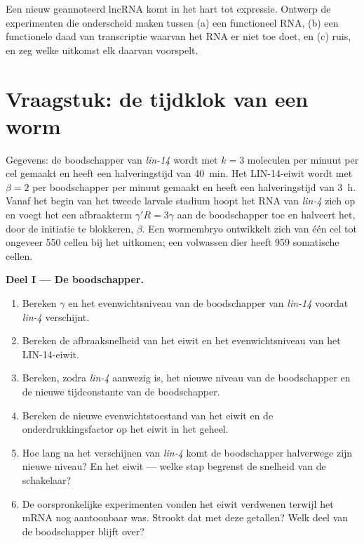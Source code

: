 \begin{exercise}[$\star\star\star$]\label{exo:b3:rna-regulation:12}
Een nieuw geannoteerd lncRNA komt in het hart tot expressie. Ontwerp de
experimenten die onderscheid maken tussen (a) een functioneel RNA, (b)
een functionele daad van transcriptie waarvan het RNA er niet toe doet,
en (c) ruis, en zeg welke uitkomst elk daarvan voorspelt.
\end{exercise}

\section{Vraagstuk: de tijdklok van een worm}

\begin{problem}
\label{pb:b3:rna-regulation:1}
Gegevens: de boodschapper van \emph{lin-14} wordt met $k = 3$ moleculen
per minuut per cel gemaakt en heeft een halveringstijd van
\qty{40}{min}. Het LIN-14-eiwit wordt met $\beta = 2$ per boodschapper
per minuut gemaakt en heeft een halveringstijd van \qty{3}{h}. Vanaf
het begin van het tweede larvale stadium hoopt het RNA van
\emph{lin-4} zich op en voegt het een afbraakterm $\gamma' R = 3\gamma$
aan de boodschapper toe en halveert het, door de initiatie te
blokkeren, $\beta$. Een wormembryo ontwikkelt zich van één cel tot
ongeveer \num{550} cellen bij het uitkomen; een volwassen dier heeft
\num{959} somatische cellen.

\medskip
\noindent\textbf{Deel I --- De boodschapper.}
\begin{enumerate}
  \item Bereken $\gamma$ en het evenwichtsniveau van de boodschapper
        van \emph{lin-14} voordat \emph{lin-4} verschijnt.
  \item Bereken de afbraaksnelheid van het eiwit en het
        evenwichtsniveau van het LIN-14-eiwit.
  \item Bereken, zodra \emph{lin-4} aanwezig is, het nieuwe niveau van
        de boodschapper en de nieuwe tijdconstante van de boodschapper.
  \item Bereken de nieuwe evenwichtstoestand van het eiwit en de
        onderdrukkingsfactor op het eiwit in het geheel.
  \item Hoe lang na het verschijnen van \emph{lin-4} komt de
        boodschapper halverwege zijn nieuwe niveau? En het eiwit ---
        welke stap begrenst de snelheid van de schakelaar?
  \item De oorspronkelijke experimenten vonden het eiwit verdwenen
        terwijl het mRNA nog aantoonbaar was. Strookt dat met deze
        getallen? Welk deel van de boodschapper blijft over?
\end{enumerate}


\end{problem}
